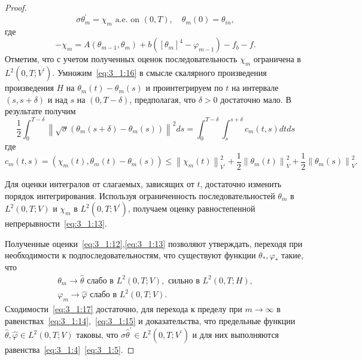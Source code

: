 \begin{proof}
    \begin{equation}
        \label{eq:3_1:16}
        \sigma \theta_{m}^{\prime}=\chi_{m}
        \text { a.e. on }(0, T), \quad \theta_{m}(0)=\theta_{i n},
    \end{equation}
    где
    \[
        -\chi_{m}=A\left(\theta_{m-1},
        \theta_{m}\right)+b\left(\left[\theta_{m}\right]^{4}
        -\varphi_{m-1}\right)-f_{b}-f.
    \]
    Отметим, что с учетом полученных оценок последовательность
    $\chi_{m}$ ограничена в $L^{2}\left(0, T ; V^{\prime}\right)$.
    Умножим~\eqref{eq:3_1:16} в смысле скалярного произведения произведения
    $H$ на $\theta_{m}(t)-\theta_{m}(s)$
    и проинтегрируем по $t$ на интервале $(s, s+\delta)$ и
    над $s$ на $(0, T-\delta)$, предполагая, что $\delta>0$ достаточно мало.
    В результате получим
    \[
        \frac{1}{2} \int_{0}^{T-\delta}\left\|\sqrt{\sigma}\left(\theta_{m}(s+\delta)
        - \theta_{m}(s)\right)\right\|^{2} d s
        = \int_{0}^{T-\delta} \int_{s}^{s+\delta} c_{m}(t, s) d t d s
    \]
    где
    \[
        c_{m}(t, s)=\left(\chi_{m}(t), \theta_{m}(t)-\theta_{m}(s)\right)
        \leq\left\|\chi_{m}(t)\right\|_{V^{\prime}}^{2}
        +\frac{1}{2}\left\|\theta_{m}(t)\right\|_{V}^{2}
        +\frac{1}{2}\left\|\theta_{m}(s)\right\|_{V}^{2}.
    \]

    Для оценки интегралов от слагаемых, зависящих от $t$,
    достаточно изменить порядок интегрирования.
    Используя ограниченность последовательностей
    $\theta_{m}$ в $L^{2}(0, T ; V)$ и $\chi_{m}$ в $L^{2}\left(0, T ; V^{\prime}\right)$,
    получаем оценку равностепенной непрерывности~\eqref{eq:3_1:13}.

    Полученные оценки~\eqref{eq:3_1:12},\eqref{eq:3_1:13}
    позволяют утверждать,
    переходя при необходимости к подпоследовательностям,
    что существуют функции $\theta_{*}, \varphi_{*}$ такие, что
    \begin{equation}
        \label{eq:3_1:17}
        \begin{aligned}
            \theta_{m} \rightarrow \widehat{\theta}
            \text { слабо в } L^{2}(0, T ; V),
            \text { сильно в } L^{2}(0, T ; H), \\
            \varphi_{m} \rightarrow \widehat{\varphi}
            \text { слабо в } L^{2}(0, T ; V).
        \end{aligned}
    \end{equation}
    Сходимости~\eqref{eq:3_1:17} достаточно, для перехода к пределу
    при $m \rightarrow \infty$
    в равенствах~\eqref{eq:3_1:14},~\eqref{eq:3_1:15}
    и доказательства, что предельные функции $\widehat{\theta},
    \widehat{\varphi } \in L^{2}(0, T ; V)$ таковы,
    что $\sigma \widehat{\theta}^{\prime} \in L^{2}\left(0, T ; V^{ \prime}\right)$
    и для них выполняются равенства~\eqref{eq:3_1:4}~\eqref{eq:3_1:5}.
\end{proof}

